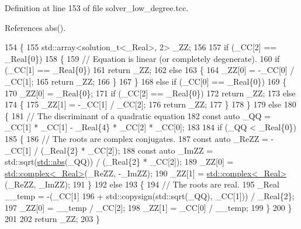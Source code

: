 Definition at line 153 of file solver\+\_\+low\+\_\+degree.\+tcc.



References abs().


\begin{DoxyCode}
154     \{
155       std::array<solution\_t<\_Real>, 2> \_ZZ;
156 
157       \textcolor{keywordflow}{if} (\_CC[2] == \_Real\{0\})
158         \{
159           \textcolor{comment}{// Equation is linear (or completely degenerate).}
160           \textcolor{keywordflow}{if} (\_CC[1] == \_Real\{0\})
161             \textcolor{keywordflow}{return} \_ZZ;
162           \textcolor{keywordflow}{else}
163             \{
164               \_ZZ[0] = -\_CC[0] / \_CC[1];
165               \textcolor{keywordflow}{return} \_ZZ;
166             \}
167         \}
168       \textcolor{keywordflow}{else} \textcolor{keywordflow}{if} (\_CC[0] == \_Real\{0\})
169         \{
170           \_ZZ[0] = \_Real\{0\};
171           \textcolor{keywordflow}{if} (\_CC[2] == \_Real\{0\})
172             \textcolor{keywordflow}{return} \_ZZ;
173           \textcolor{keywordflow}{else}
174             \{
175               \_ZZ[1] = -\_CC[1] / \_CC[2];
176               \textcolor{keywordflow}{return} \_ZZ;
177             \}
178         \}
179       \textcolor{keywordflow}{else}
180         \{
181           \textcolor{comment}{// The discriminant of a quadratic equation}
182           \textcolor{keyword}{const} \textcolor{keyword}{auto} \_QQ = \_CC[1] * \_CC[1] - \_Real\{4\} * \_CC[2] * \_CC[0];
183 
184           \textcolor{keywordflow}{if} (\_QQ < \_Real\{0\})
185             \{
186               \textcolor{comment}{// The roots are complex conjugates.}
187               \textcolor{keyword}{const} \textcolor{keyword}{auto} \_ReZZ = -\_CC[1] / (\_Real\{2\} * \_CC[2]);
188               \textcolor{keyword}{const} \textcolor{keyword}{auto} \_ImZZ = std::sqrt(\hyperlink{namespace____gnu__cxx_ab9eb9db3560f504f8cd25a71bcb6ead5}{std::abs}(\_QQ)) / (\_Real\{2\} * \_CC[2]);
189               \_ZZ[0] = \hyperlink{classstd_1_1complex}{std::complex<\_Real>}(\_ReZZ, -\_ImZZ);
190               \_ZZ[1] = \hyperlink{classstd_1_1complex}{std::complex<\_Real>}(\_ReZZ, \_ImZZ);
191             \}
192           \textcolor{keywordflow}{else}
193             \{
194               \textcolor{comment}{// The roots are real.}
195               \_Real \_\_temp = -(\_CC[1]
196                         + std::copysign(std::sqrt(\_QQ), \_CC[1])) / \_Real\{2\};
197               \_ZZ[0] = \_\_temp / \_CC[2];
198               \_ZZ[1] = \_CC[0] / \_\_temp;
199             \}
200         \}
201 
202       \textcolor{keywordflow}{return} \_ZZ;
203     \}
\end{DoxyCode}
\mbox{\label{namespace____gnu__cxx_af7f59d18caa0bf264f591103478ebcb2}} 
